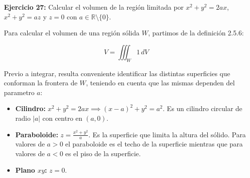 \textbf{Ejercicio 27:} Calcular el volumen de la región limitada por $x^2 + y^2 = 2ax$, $x^2 + y^2 = az$ y $z = 0$ con $a \in \mathbb{R} \setminus \{0\}$.

Para calcular el volumen de una región sólida $W$, partimos de la definición 2.5.6:

\begin{equation}
    V = \iiint_{W} 1 \, dV
\end{equation}

Previo a integrar, resulta conveniente identificar las distintas superficies que conforman la frontera de $W$, teniendo en cuenta que las mismas dependen del parametro $a$:
\begin{itemize}
    \item \textbf{Cilindro:} $x^2 + y^2 = 2ax \implies (x-a)^2 + y^2 = a^2$. Es un cilindro circular de radio $|a|$ con centro en $(a,0)$.
    \item \textbf{Paraboloide:} $z = \frac{x^2 + y^2}{a}$. Es la superficie que limita la altura del sólido. Para valores de $a > 0$ el paraboloide es el techo de la superficie mientras que para valores de $a < 0$ es el piso de la superficie. 
    \item \textbf{Plano $xy$:} $z = 0$.
\end{itemize}


